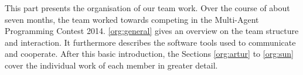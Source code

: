 This part presents the organisation of our team work.
Over the course of about seven months, the team worked towards competing in the Multi-Agent Programming Contest 2014.
\autoref{org:general} gives an overview on the team structure and interaction.
It furthermore describes the software tools used to communicate and cooperate.
After this basic introduction, the Sections \ref{org:artur} to \ref{org:sun} cover the individual work of each member in greater detail.














